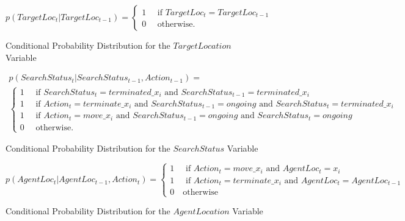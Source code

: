 \begin{figure}[H]
\scriptsize
\begin{equation}\label{eqn:TargetLocProbs}
    p(TargetLoc_{t} | TargetLoc_{t-1}) =
    \begin{cases}
    1 \quad \text{ if } TargetLoc_{t}=TargetLoc_{t-1}
    \\
    0 \quad \text { otherwise. }
    \end{cases}
\end{equation}
\caption{Conditional Probability Distribution for the $TargetLocation$ Variable}
\end{figure}





\begin{figure}[H]
\scriptsize
    \begin{gather}\label{eqn:SearchStatus}
        p(SearchStatus_t | SearchStatus_{t-1}, Action_{t-1}) = \\
        \begin{cases}
        1 \quad \text{ if } SearchStatus_t = terminated\_x_i \text{ and } SearchStatus_{t-1} = terminated\_x_i 
        \\
        1 \quad \text{ if } Action_t = terminate\_x_i \text{ and } SearchStatus_{t-1}=ongoing \text{ and } SearchStatus_{t} = terminated\_x_i
        \\
        1 \quad \text{ if } Action_t = move\_x_i \text{ and } SearchStatus_{t-1}=ongoing \text{ and } SearchStatus_t=ongoing
        \\
        0 \quad \text { otherwise. }
        \end{cases}
    \end{gather}
\caption{Conditional Probability Distribution for the $SearchStatus$ Variable}
\end{figure}





\begin{figure}[H]
\scriptsize
    \begin{equation}\label{eqn:AgentLocation}
        p(AgentLoc_t | AgentLoc_{t-1}, Action_{t}) = 
        \begin{cases}
        1 \quad \text{ if } Action_t = move\_x_i \text{ and } AgentLoc_t = x_i
        \\
        1 \quad \text{ if } Action_t = terminate\_x_i \text{ and } AgentLoc_t = AgentLoc_{t-1}
        \\
        0 \quad \text{otherwise}
        \end{cases}
    \end{equation}
\caption{Conditional Probability Distribution for the $AgentLocation$ Variable}
\end{figure}


